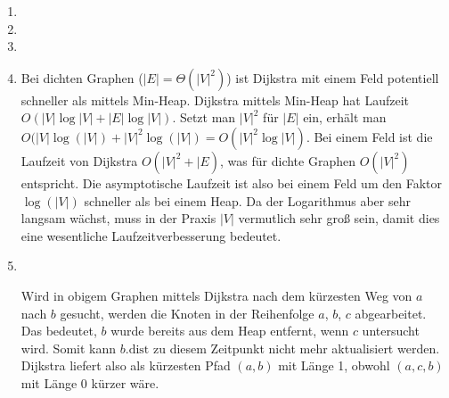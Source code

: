 \documentclass[11pt,a4paper]{article}
\begin{document}
\begin{loesung}
    \begin{enumerate}
        \item 
        \item
        \item
        \item
        Bei dichten Graphen ($|E| = \Theta(|V|^2)$) ist Dijkstra mit einem Feld potentiell schneller als mittels Min-Heap.
        Dijkstra mittels Min-Heap hat Laufzeit $O(|V| \log |V| + |E| \log |V|)$.
        Setzt man $|V|^2$ für $|E|$ ein, erhält man $O(|V| \log\left(|V|\right) + |V|^2 \log\left(|V|\right) = O(|V|^2 \log |V|)$.
        Bei einem Feld ist die Laufzeit von Dijkstra $O(|V|^2 + |E)$, was für dichte Graphen $O(|V|^2)$ entspricht.
        Die asymptotische Laufzeit ist also bei einem Feld um den Faktor $\log(|V|)$ schneller als bei einem Heap.
        Da der Logarithmus aber sehr langsam wächst, muss in der Praxis $|V|$ vermutlich sehr groß sein, damit dies eine wesentliche Laufzeitverbesserung bedeutet.
        \item \ \\
        \begin{figure}[h!]
            \centering
        \end{figure}
        \FloatBarrier
        Wird in obigem Graphen mittels Dijkstra nach dem kürzesten Weg von $a$ nach $b$ gesucht, werden die Knoten in der Reihenfolge $a$, $b$, $c$ abgearbeitet.
        Das bedeutet, $b$ wurde bereits aus dem Heap entfernt, wenn $c$ untersucht wird.
        Somit kann $b.\mathrm{dist}$ zu diesem Zeitpunkt nicht mehr aktualisiert werden.
        Dijkstra liefert also als kürzesten Pfad $(a, b)$ mit Länge 1, obwohl $(a, c, b)$ mit Länge 0 kürzer wäre.


\end{enumerate}
\end{loesung}
\end{document}
